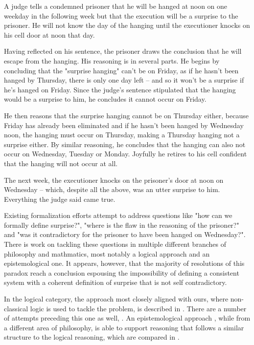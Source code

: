 \documentclass[journal]{journal}
\newenvironment{myindent}{\begin{adjustwidth}{1cm}{}}{\end{adjustwidth}}
\begin{document}
\begin{myindent}
  A judge tells a condemned prisoner that he will be hanged at noon on one weekday
  in the following week but that the execution will be a surprise to the prisoner.
  He will not know the day of the hanging until the executioner knocks on his cell door at noon that day.

  Having reflected on his sentence, the prisoner draws the conclusion that he will
  escape from the hanging. His reasoning is in several parts. He begins by concluding
  that the "surprise hanging" can't be on Friday, as if he hasn't been hanged by
  Thursday, there is only one day left – and so it won't be a surprise if he's hanged on
  Friday. Since the judge's sentence stipulated that the hanging would be a surprise
  to him, he concludes it cannot occur on Friday.

  He then reasons that the surprise hanging cannot be on Thursday either, because
  Friday has already been eliminated and if he hasn't been hanged by Wednesday noon,
  the hanging must occur on Thursday, making a Thursday hanging not a surprise either.
  By similar reasoning, he concludes that the hanging can also not occur on Wednesday,
  Tuesday or Monday. Joyfully he retires to his cell confident that the hanging will
  not occur at all.

  The next week, the executioner knocks on the prisoner's door at noon on Wednesday –
  which, despite all the above, was an utter surprise to him. Everything the judge said came true.
\end{myindent}

Existing formalization efforts attempt to address questions like "how can we formally
define surprise?", "where is the flaw in the
reasoning of the prisoner?" and "was it contradictory for the prisoner to have been
hanged on Wednesday?". There is work on tackling these questions in multiple
different branches of philosophy and mathmatics, most notably a logical approach and
an epistemological one. It appears, however, that the majority of resolutions
of this paradox reach a conclusion espousing the impossibility of
defining a consistent system with a coherent definition of surprise that is not
self contradictory.

In the logical category, the approach most closely aligned with ours, where non-classical logic is used to
tackle the problem, is described in \cite{}. There are a number of attempts preceding
this one as well, \cite{} \cite{}. An epistemological approach \cite{}, while
from a different area of philosophy, is able to support reasoning that follows
a similar structure to the logical reasoning, which are compared in \cite{}.
\end{document}
